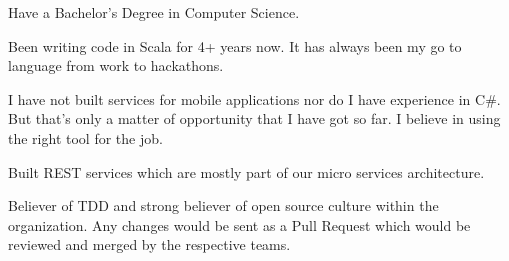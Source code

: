 \documentclass[11pt, a4paper]{awesome-cv}
\begin{document}
\begin{cvletter}
\begin{cvitems} %
  \item {Have a Bachelor's Degree in Computer Science.}
  \item {Been writing code in Scala for 4+ years now. It has always been my go to language from work to hackathons.}
  \item {I have not built services for mobile applications nor do I have experience in C#. But that's only a matter of opportunity that I have got so far. I believe in using the right tool for the job.}
  \item {Built REST services which are mostly part of our micro services architecture.}
  \item {Believer of TDD and strong believer of open source culture within the organization. Any changes would be sent as a Pull Request which would be reviewed and merged by the respective teams.}
\end{cvitems}

\end{cvletter}


\makeletterclosing
\end{document}
